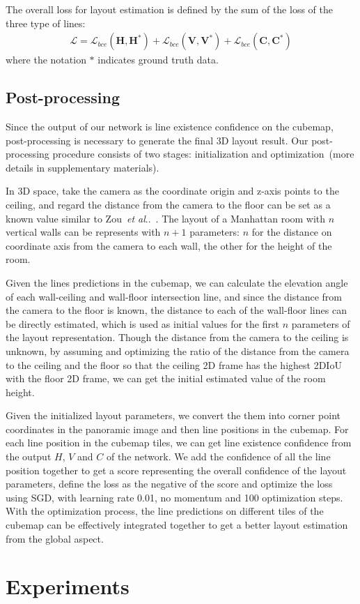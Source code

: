 \documentclass[runningheads]{llncs}
\makeatletter
\DeclareRobustCommand\onedot{\futurelet\@let@token\@onedot}
\def\@onedot{\ifx\@let@token.\else.\null\fi\xspace}
\def\etal{\emph{et al}\onedot}
\makeatother
\begin{document}
The overall loss for layout estimation is defined by the sum of the loss of the three type of lines:
\begin{equation}\begin{aligned}
\mathcal{L} = \mathcal{L}_{bce}(\mathbf{H}, \mathbf{H}^*) + \mathcal{L}_{bce}(\mathbf{V}, \mathbf{V}^*) + \mathcal{L}_{bce}(\mathbf{C}, \mathbf{C}^*)
\end{aligned}\end{equation}
where the notation $*$ indicates ground truth data.

\subsection{Post-processing}\label{sec:post}
Since the output of our network is line existence confidence on the cubemap, post-processing is necessary to generate the final 3D layout result. Our post-processing procedure consists of two stages: initialization and optimization~(more details in supplementary materials).

In 3D space, take the camera as the coordinate origin and z-axis points to the ceiling, and regard the distance from the camera to the floor can be set as a known value similar to Zou~\etal~\cite{zou2018layoutnet}. The layout of a Manhattan room with $n$ vertical walls can be represents with $n+1$ parameters: $n$ for the distance on coordinate axis from the camera to each wall, the other for the height of the room. 

Given the lines predictions in the cubemap, we can calculate the elevation angle of each wall-ceiling and wall-floor intersection line, and since the distance from the camera to the floor is known, the distance to each of the wall-floor lines can be directly estimated, which is used as initial values for the first $n$ parameters of the layout representation. Though the distance from the camera to the ceiling is unknown, by assuming and optimizing the ratio of the distance from the camera to the ceiling and the floor so that the ceiling 2D frame has the highest 2DIoU with the floor 2D frame, we can get the initial estimated value of the room height. 

Given the initialized layout parameters, we convert the them into corner point coordinates in the panoramic image and then line positions in the cubemap. For each line position in the cubemap tiles, we can get line existence confidence from the output $H$, $V$ and $C$ of the network. We add the confidence of all the line position together to get a score representing the overall confidence of the layout parameters, define the loss as the negative of the score and optimize the loss using SGD, with learning rate 0.01, no momentum and 100 optimization steps. With the optimization process, the line predictions on different tiles of the cubemap can be effectively integrated together to get a better layout estimation from the global aspect. \section{Experiments}
\end{document}
